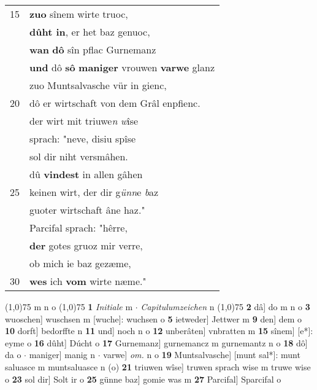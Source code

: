 \documentclass[8pt,a4paper,notitlepage]{article}
\begin{document}
\begin{table}[ht]
\begin{minipage}[t]{0.5\linewidth}
\begin{tabular}{rl}
15 & \textbf{zuo} sînem wirte truoc,\\ 
 & \textbf{dûht in}, er het baz genuoc,\\ 
 & \textbf{wan} \textbf{dô} sîn pflac Gurnemanz\\ 
 & \textbf{und} dô \textbf{sô} \textbf{maniger} vrouwen \textbf{varwe} glanz\\ 
 & zuo Muntsalvasche vür in gienc,\\ 
20 & dô er wirtschaft von dem Grâl enpfienc.\\ 
 & der wirt mit triuwe\textit{n} \textit{w}îse\\ 
 & sprach: "neve, disiu spîse\\ 
 & sol dir niht versmâhen.\\ 
 & dû \textbf{vindest} in allen gâhen\\ 
25 & keinen wirt, der dir g\textit{ünn}e \textit{b}az\\ 
 & guoter wirtschaft âne haz."\\ 
 & Parcifal sprach: "hêrre,\\ 
 & \textbf{der} gotes gruoz mir verre,\\ 
 & ob mich ie baz gezæme,\\ 
30 & \textbf{wes} ich \textbf{vom} wirte næme."\\ 
\end{tabular}
\scriptsize
\line(1,0){75} \newline
m n o \newline
\line(1,0){75} \newline
\textbf{1} \textit{Initiale} m   $\cdot$ \textit{Capitulumzeichen} n  \newline
\line(1,0){75} \newline
\textbf{2} dâ] do m n o \textbf{3} wuoschen] wuschsen m [wuche]: wuchsen o \textbf{5} ietweder] Jettwer m \textbf{9} den] dem o \textbf{10} dorft] bedorffte n \textbf{11} und] noch n o \textbf{12} unberâten] vnbratten m \textbf{15} sînem] [e*]: eyme o \textbf{16} dûht] Dúcht o \textbf{17} Gurnemanz] gurnemancz m gurnemantz n o \textbf{18} dô] da o  $\cdot$ maniger] manig n  $\cdot$ varwe] \textit{om.} n o \textbf{19} Muntsalvasche] [munt sal*]: munt saluasce m muntsaluasce n (o) \textbf{21} triuwen wîse] truwen sprach wise m truwe wise o \textbf{23} sol dir] Solt ir o \textbf{25} günne baz] gomie was m \textbf{27} Parcifal] Sparcifal o \newline
\end{minipage}
\end{table}
\newpage
\end{document}

